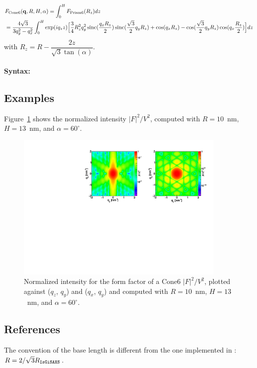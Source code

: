 \begin{align*}
&F_{\rm{Cone6}}(\mathbf{q}, R, H, \alpha) =\int_0^H
F_{\rm{Prism6}}(R_z)dz\\
&= \frac{4\sqrt{3}}{3q_y ^2 - q_x^2}\int_0 ^H \exp(iq_z z)
\Big[\frac{3}{4}R_z^2q_y^2 \operatorname{sinc}(\frac{q_xR_z}{2})\operatorname{sinc}(\frac{\sqrt{3}}{2}q_y
R_z)+\cos(q_xR_z)-\cos(\frac{\sqrt{3}}{2}q_y R_z)\cos(q_x \frac{R_z}{2}) \Big]dz
\end{align*}
with $R_z=R-\dfrac{2z}{\sqrt{3}\tan(\alpha)}$.

\paragraph{Syntax:}  

\subsection{Examples}
Figure~\ref{figFFCone6Ex} shows the normalized intensity
$|F|^2/V^2$, computed with $R=10$~nm, $H=13$~nm, and
$\alpha=60^{\circ}$.

\begin{figure}[h]
\begin{center}
\includegraphics[width=0.9\textwidth]{Figures/figffcone6}
\end{center}
\caption{Normalized intensity for the form factor of a Cone6 $|F|^2/V^2$, plotted against ($q_z$, $q_y$) and ($q_x$, $q_y$) and  computed with $R=10$~nm, $H=13$~nm, and $\alpha=60^{\circ}$.}
\label{figFFCone6Ex}
\end{figure}
\FloatBarrier

\subsection{References}
The convention of the base length is different
from the one implemented in : $R =
2/\sqrt{3}R_{\text{\texttt{IsGiSAXS}}}$.

